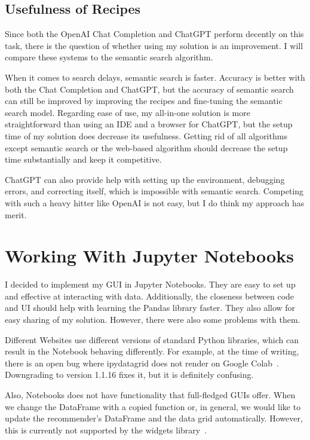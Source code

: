 \documentclass[
     12pt,                    %
     a4paper,             %
     BCOR=10mm,     %
     DIV=14,                 %
     listof=totoc,                    %
     bibliography=totoc,       %
     index=totoc,              %
     twoside,
     headsepline
     ]{scrreprt}
\begin{document}
\subsection{Usefulness of Recipes}

Since both the OpenAI Chat Completion and ChatGPT perform decently on this task, there is the question of whether using my solution is an improvement. I will compare these systems to the semantic search algorithm.

When it comes to search delays, semantic search is faster. Accuracy is better with both the Chat Completion and ChatGPT, but the accuracy of semantic search can still be improved by improving the recipes and fine-tuning the semantic search model. Regarding ease of use, my all-in-one solution is more straightforward than using an IDE and a browser for ChatGPT, but the setup time of my solution does decrease its usefulness. Getting rid of all algorithms except semantic search or the web-based algorithm should decrease the setup time substantially and keep it competitive.

ChatGPT can also provide help with setting up the environment, debugging errors, and correcting itself, which is impossible with semantic search. Competing with such a heavy hitter like OpenAI is not easy, but I do think my approach has merit.

\section{Working With Jupyter Notebooks}

I decided to implement my GUI in Jupyter Notebooks. They are easy to set up and effective at interacting with data. Additionally, the closeness between code and UI should help with learning the Pandas library faster. They also allow for easy sharing of my solution.
However, there were also some problems with them.

Different Websites use different versions of standard Python libraries, which can result in the Notebook behaving differently. For example, at the time of writing, there is an open bug where ipydatagrid does not render on Google Colab~\cite{ipydatagridbug}. Downgrading to version 1.1.16 fixes it, but it is definitely confusing.

Also, Notebooks does not have functionality that full-fledged GUIs offer. When we change the DataFrame with a copied function or, in general, we would like to update the recommender's DataFrame and the data grid automatically. However, this is currently not supported by the widgets library~\cite{widgetsunsupported}.
\end{document}
